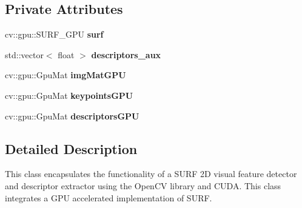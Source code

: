 \subsection*{Private Attributes}
\begin{DoxyCompactItemize}
\item 
\hypertarget{class_visual_feature_descriptor_extractor___s_u_r_f___g_p_u_a6c5740d8a8de3d2010a02c524bf54bd7}{
cv::gpu::SURF\_\-GPU {\bfseries surf}}
\label{class_visual_feature_descriptor_extractor___s_u_r_f___g_p_u_a6c5740d8a8de3d2010a02c524bf54bd7}

\item 
\hypertarget{class_visual_feature_descriptor_extractor___s_u_r_f___g_p_u_a5fbe8308ae8cb7c0e2743dcbd7ac9291}{
std::vector$<$ float $>$ {\bfseries descriptors\_\-aux}}
\label{class_visual_feature_descriptor_extractor___s_u_r_f___g_p_u_a5fbe8308ae8cb7c0e2743dcbd7ac9291}

\item 
\hypertarget{class_visual_feature_descriptor_extractor___s_u_r_f___g_p_u_ab18da50bfdc5aa8a233937fcfe5eedc1}{
cv::gpu::GpuMat {\bfseries imgMatGPU}}
\label{class_visual_feature_descriptor_extractor___s_u_r_f___g_p_u_ab18da50bfdc5aa8a233937fcfe5eedc1}

\item 
\hypertarget{class_visual_feature_descriptor_extractor___s_u_r_f___g_p_u_a550538d586f31def7935183111acb19b}{
cv::gpu::GpuMat {\bfseries keypointsGPU}}
\label{class_visual_feature_descriptor_extractor___s_u_r_f___g_p_u_a550538d586f31def7935183111acb19b}

\item 
\hypertarget{class_visual_feature_descriptor_extractor___s_u_r_f___g_p_u_a2410bf2aa3e2330e4ae7d141ff8179d6}{
cv::gpu::GpuMat {\bfseries descriptorsGPU}}
\label{class_visual_feature_descriptor_extractor___s_u_r_f___g_p_u_a2410bf2aa3e2330e4ae7d141ff8179d6}

\end{DoxyCompactItemize}


\subsection{Detailed Description}
This class encapsulates the functionality of a SURF 2D visual feature detector and descriptor extractor using the OpenCV library and CUDA. This class integrates a GPU accelerated implementation of SURF. 


